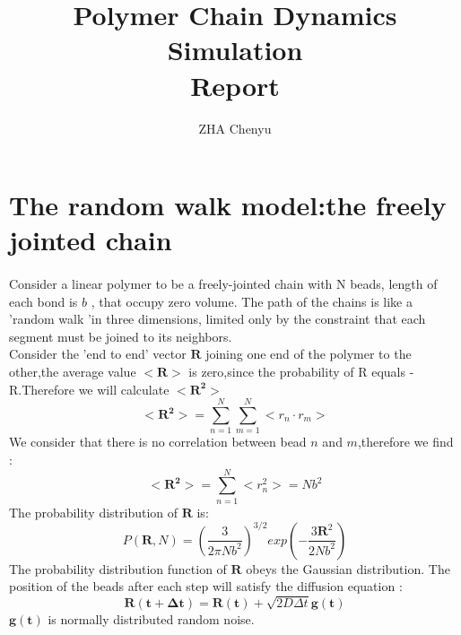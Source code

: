 \documentclass{article}
\title{\LARGE{Polymer Chain Dynamics Simulation}\\ \large{Report}
}
\author{ZHA Chenyu}
\begin{document}
\maketitle
\pagebreak


\section{The random walk model:the freely jointed chain}
\paragraph{}

Consider a linear polymer to be a freely-jointed chain with N beads, length of each bond is $b$ , that occupy zero volume. The path of the chains is like a 'random walk 'in three dimensions, limited only by the constraint that each segment must be joined to its neighbors.\\

Consider the 'end to end' vector $\bm{R}$ joining one end of the polymer to the other,the average value $<\bm{R}>$ is zero,since the probability of R equals -R.Therefore we will calculate $<\bm{R^2}>$
\begin{equation}
<\bm{R^2}>=\sum_{{n=1}}^{N}\sum_{m=1}^{N}<r_n\cdot r_m>
\end{equation} 
We consider that there is no correlation between bead $n$ and $m$,therefore we find :
\begin{equation}
<\bm{R^2}>=\sum_{{n=1}}^{N}<r_n^2>=Nb^2
\end{equation}
The probability distribution of $\bm{R}$ is:
\begin{equation}
P(\bm{R},N)=(\frac{3}{2\pi Nb^2})^{3/2}exp(-\frac{3\bm{R}^2}{2Nb^2})
\end{equation}
The probability distribution function of $\bm{R}$ obeys the Gaussian distribution.
The position of the beads after each step will satisfy the diffusion equation :
\begin{equation}
\bm{R(t+\Delta t)}=\bm{R(t)}+\sqrt{2D\Delta t}\bm{g(t)}
\end{equation}
$\bm{g(t)}$ is normally distributed random noise.
\end{document}

